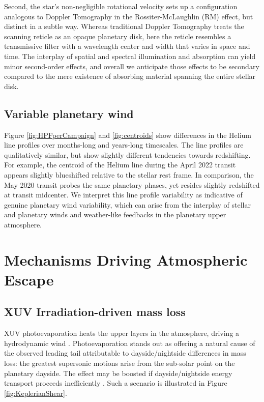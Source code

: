 \documentclass[linenumbers, twocolumn, trackchanges]{aastex631}
\begin{document}
Second, the star's non-negligible rotational velocity sets up a configuration analogous to Doppler Tomography in the Rossiter-McLaughlin (RM) effect, but distinct in a subtle way.  Whereas traditional Doppler Tomography treats the scanning reticle as an opaque planetary disk, here the reticle resembles a transmissive filter with a wavelength center and width that varies in space and time.  The interplay of spatial and spectral illumination and absorption can yield minor second-order effects, and overall we anticipate those effects to be secondary compared to the mere existence of absorbing material spanning the entire stellar disk.

\subsection{Variable planetary wind}
Figure \ref{fig:HPFperCampaign} and \ref{fig:centroids} show differences in the Helium line profiles over months-long and years-long timescales.  The line profiles are qualitatively similar, but show slightly different tendencies towards redshifting.  For example, the centroid of the Helium line during the April 2022 transit appears slightly blueshifted relative to the stellar rest frame.  In comparison, the May 2020 transit probes the same planetary phases, yet resides slightly redshifted at transit midcenter.  We interpret this line profile variability as indicative of genuine planetary wind variability, which can arise from the interplay of stellar and planetary winds \citep{2009ApJ...693...23M} and weather-like feedbacks in the planetary upper atmosphere.

\section{Mechanisms Driving Atmospheric Escape}\label{secPhysMech}

\subsection{XUV Irradiation-driven mass loss}
XUV photoevaporation heats the upper layers in the atmosphere, driving a hydrodynamic wind \citep{2009ApJ...693...23M}.  Photoevaporation stands out as offering a natural cause of the observed leading tail attributable to dayside/nightside differences in mass loss: the greatest supersonic motions arise from the sub-solar point on the planetary dayside.  The effect may be boosted if dayside/nightside energy transport proceeds inefficiently \citep{2009ApJ...693...23M}.  Such a scenario is illustrated in Figure \ref{fig:KeplerianShear}.
\end{document}
